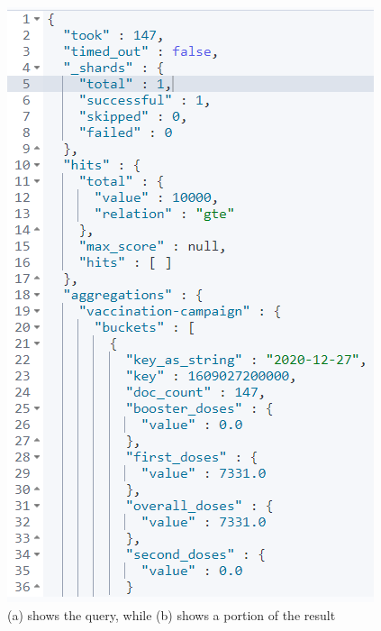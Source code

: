 \documentclass{article}[IEEEtran]
\begin{document}
\begin{figure}[H]
\begin{center}
\begin{minipage}[b]{0.4\textwidth}
    \includegraphics[width=\textwidth, frame]{Answer_Query_1.PNG}
     \subcaption{}
  \end{minipage}
  \caption{(a) shows the query, while (b) shows a portion of the result}
\end{center}
\end{figure}
\end{document}
